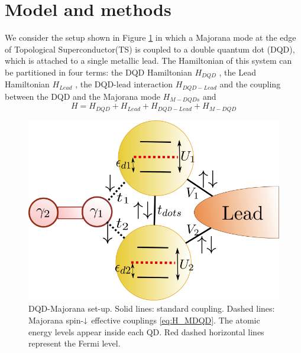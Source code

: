 \documentclass[showpacs,aps,prb,reprint,superscriptaddress]{revtex4-1}
\newcommand{\LUIS}[1]{\textcolor{blue}{\fbox{Luis} {\sl#1}}}
\begin{document}
\section{Model and methods}
\label{sec:modelmethods}


We consider the setup shown in Figure \ref{fig:GenModel} in which a Majorana mode at the edge of Topological Superconductor(TS) is coupled to a double quantum dot (DQD), which is attached to a single metallic lead. The Hamiltonian of this system can be partitioned in four terms: the DQD Hamiltonian $H_{DQD}$ , the Lead Hamiltonian $H_{Lead}$ , the DQD-lead interaction  $H_{DQD-Lead}$ and the coupling between the DQD and the Majorana mode $H_{M-DQDs}$ and   
\begin{equation}
H=H_{DQD}+H_{Lead}+H_{DQD-Lead}+H_{M-DQD} 
\label{eq:Model}
\end{equation}


\begin{figure}[bt]
\begin{center}
\includegraphics[scale=0.4]{Graficos/GenModel.png}
\caption{ DQD-Majorana set-up. Solid lines: standard coupling. Dashed lines: Majorana spin-$\downarrow$ effective couplings \eqref{eq:H_MDQD}. The atomic energy levels appear inside each QD. Red dashed horizontal lines represent the Fermi level.  
}
%
\label{fig:GenModel}
\end{center}
\end{figure}
\end{document}
